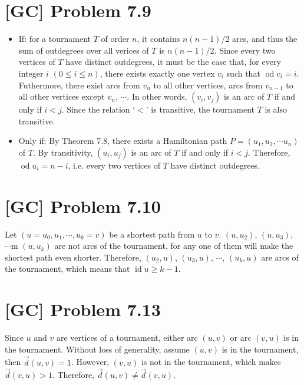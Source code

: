 \documentclass[a4paper,11pt,twocolumn]{article}
\newcommand{\id}{\mathop{\mathrm{id}}}
\newcommand{\od}{\mathop{\mathrm{od}}}
\begin{document}
   \section{[GC] Problem 7.9}
   \begin{itemize}
   	 \item If: for a tournament $T$ of order $n$, it contains $n(n-1)/2$ arcs, and thus the sum of outdegrees over all verices of $T$ is $n(n-1)/2$. Since every two vertices of $T$ have distinct outdegrees, it must be the case that, for every integer $i$ $(0 \leq i \leq n)$, there exists exactly one vertex $v_i$ such that $\od{v_i} = i$. Futhermore, there exist arcs from $v_n$ to all other vertices, arcs from $v_{n-1}$ to all other vertices except $v_n$, $\cdots$. In other words, $(v_i, v_j)$ is an arc of $T$ if and only if $i < j$. Since the relation `$<$' is transitive, the tournament $T$ is also transitive.
	\item Only if: By Theorem 7.8, there exists a Hamiltonian path $P=(u_1, u_2, \cdots u_n)$ of $T$. By transitivity, $(u_i, u_j)$ is an arc of $T$ if and only if $i < j$. Therefore, $\od{u_i} = n-i$, i.e. every two vertices of $T$ have distinct outdegrees. 
   \end{itemize}
   
   \section{[GC] Problem 7.10}
   Let $(u = u_0, u_1, \cdots, u_k = v)$ be a shortest path from $u$ to $v$. $(u, u_2)$, $(u, u_3)$, $\cdots$m $(u, u_k)$ are not arcs of the tournament, for any one of them will make the shortest path even shorter. Therefore, $(u_2, u)$, $(u_3, u)$, $\cdots$, $(u_k, u)$ are arcs of the tournament, which means that $\id{u} \geq k-1$.
   
   \section{[GC] Problem 7.13}
   Since $u$ and $v$ are vertices of a tournament, either arc $(u, v)$ or arc $(v, u)$ is in the tournament. Without loss of generality, assume $(u, v)$ is in the tournament, then $\vec{d}(u, v) = 1$. However, $(v, u)$ is not in the tournament, which makes $\vec{d}(v, u) > 1$. Therefore, $\vec{d}(u, v) \neq \vec{d}(v, u)$.
   
\end{document}
